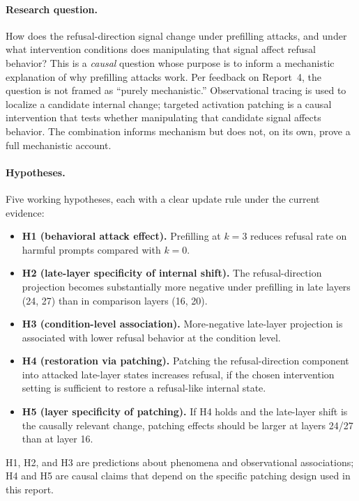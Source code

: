 \documentclass{article}
\begin{document}
\paragraph{Research question.}
How does the refusal-direction signal change under prefilling attacks, and
under what intervention conditions does manipulating that signal affect
refusal behavior? This is a \emph{causal} question whose purpose is to inform
a mechanistic explanation of why prefilling attacks work. Per feedback on
Report~4, the question is not framed as ``purely mechanistic.'' Observational
tracing is used to localize a candidate internal change; targeted activation
patching is a causal intervention that tests whether manipulating that
candidate signal affects behavior. The combination informs mechanism but does
not, on its own, prove a full mechanistic account.

\paragraph{Hypotheses.}
Five working hypotheses, each with a clear update rule under the current
evidence:

\begin{itemize}
\item \textbf{H1 (behavioral attack effect).} Prefilling at $k=3$ reduces
  refusal rate on harmful prompts compared with $k=0$.
\item \textbf{H2 (late-layer specificity of internal shift).} The
  refusal-direction projection becomes substantially more negative under
  prefilling in late layers (24, 27) than in comparison layers (16, 20).
\item \textbf{H3 (condition-level association).} More-negative late-layer
  projection is associated with lower refusal behavior at the condition level.
\item \textbf{H4 (restoration via patching).} Patching the refusal-direction
  component into attacked late-layer states increases refusal, if the chosen
  intervention setting is sufficient to restore a refusal-like internal state.
\item \textbf{H5 (layer specificity of patching).} If H4 holds and the
  late-layer shift is the causally relevant change, patching effects should be
  larger at layers 24/27 than at layer 16.
\end{itemize}

H1, H2, and H3 are predictions about phenomena and observational
associations; H4 and H5 are causal claims that depend on the specific
patching design used in this report.
\end{document}
